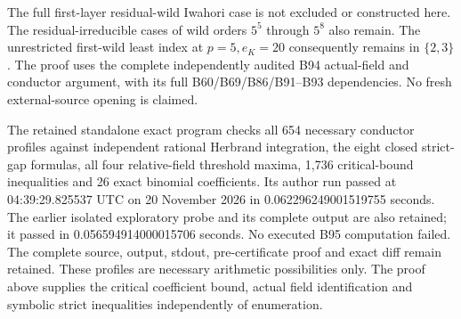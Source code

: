 \begin{remark}
\label{rem:B-RD95-scope}
The full first-layer residual-wild Iwahori case is not excluded or
constructed here. The residual-irreducible cases of wild orders
$5^5$ through $5^8$ also remain. The unrestricted first-wild least
index at $p=5,e_K=20$ consequently remains in $\{2,3\}$.
The proof uses the complete independently audited B94 actual-field
and conductor argument, with its full B60/B69/B86/B91--B93
dependencies. No fresh external-source opening is claimed.

The retained standalone exact program
checks all 654 necessary conductor profiles against independent
rational Herbrand integration, the eight closed strict-gap formulas,
all four relative-field threshold maxima, 1,736 critical-bound
inequalities and 26 exact binomial coefficients. Its author run
passed at 04:39:29.825537 UTC on 20 November 2026 in
0.062296249001519755 seconds. The earlier isolated exploratory
probe and its complete output are also retained; it passed in
0.056594914000015706 seconds. No executed B95 computation failed.
The complete source, output, stdout, pre-certificate proof and exact
diff remain retained. These profiles are necessary arithmetic
possibilities only. The proof above supplies the critical coefficient
bound, actual field identification and symbolic strict inequalities
independently of enumeration.
\end{remark}
